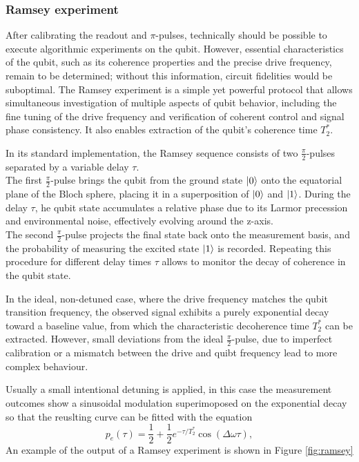 \subsubsection{Ramsey experiment}\label{subsec:Ramsey}
After calibrating the readout and $\pi$-pulses, technically should be possible to execute algorithmic experiments on the qubit. 
However, essential characteristics of the qubit, such as its coherence properties and the precise drive frequency, remain to be determined; without this information, circuit fidelities would be suboptimal. 
The Ramsey experiment is a simple yet powerful protocol that allows simultaneous investigation of multiple aspects of qubit behavior, including the fine tuning of the drive frequency and verification of coherent control and signal phase consistency. 
It also enables extraction of the qubit's coherence time $T_2^*$.

In its standard implementation, the Ramsey sequence consists of two $\frac{\pi}{2}$-pulses separated by a variable delay $\tau$.\\
The first $\frac{\pi}{2}$-pulse brings the qubit from the ground state $\ket{0}$ onto the equatorial plane of the Bloch sphere, placing it in a superposition of $\ket{0}$ and $\ket{1}$.
During the delay $\tau$, he qubit state accumulates a relative phase due to its Larmor precession and environmental noise, effectively evolving around the z-axis.\\
The second $\frac{\pi}{2}$-pulse projects the final state back onto the measurement basis, and the probability of measuring the excited state $\ket{1}$ is recorded.
Repeating this procedure for different delay times $\tau$ allows to monitor the decay of coherence in the qubit state.

In the ideal, non-detuned case, where the drive frequency matches the qubit transition frequency, the observed signal exhibits a purely exponential decay toward a baseline value, from which the characteristic decoherence time $T_2^*$ can be extracted.
However, small deviations from the ideal $\frac{\pi}{2}$-pulse, due to imperfect calibration or a mismatch between the drive and quibt frequency lead to more complex behaviour.

Usually a small intentional detuning is applied, in this case the measurement outcomes show a sinusoidal modulation superimoposed on the exponential decay so that the reuslting curve can be fitted with the equation \cite{Baur2012RealizingQG}
\begin{equation}\label{eq:Ramsey}
    p_e(\tau) = \frac{1}{2} + \frac{1}{2}e^{-\tau/T_2^*}\cos{(\Delta\omega \tau)},
\end{equation}
An example of the output of a Ramsey experiment is shown in Figure \ref{fig:ramsey}

